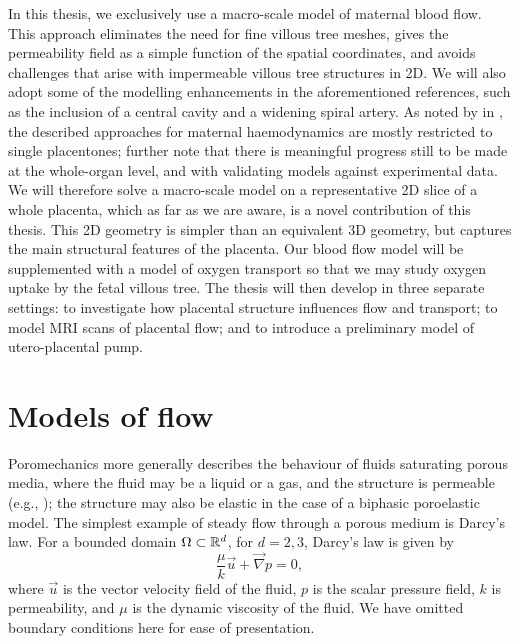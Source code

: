         In this thesis, we exclusively use a macro-scale model of maternal blood flow. This approach eliminates the need for fine villous tree meshes, gives the permeability field as a simple function of the spatial coordinates, and avoids challenges that arise with impermeable villous tree structures in 2D. We will also adopt some of the modelling enhancements in the aforementioned references, such as the inclusion of a central cavity and a widening spiral artery. As noted by \citeauthor{jensenBloodFlowTransport2019} in \cite{jensenBloodFlowTransport2019}, the described approaches for maternal haemodynamics are mostly restricted to single placentones; \citeauthor{jensenBloodFlowTransport2019} further note that there is meaningful progress still to be made at the whole-organ level, and with validating models against experimental data. We will therefore solve a macro-scale model on a representative 2D slice of a whole placenta, which as far as we are aware, is a novel contribution of this thesis. This 2D geometry is simpler than an equivalent 3D geometry, but captures the main structural features of the placenta. Our blood flow model will be supplemented with a model of oxygen transport so that we may study oxygen uptake by the fetal villous tree. The thesis will then develop in three separate settings: to investigate how placental structure influences flow and transport; to model MRI scans of placental flow; and to introduce a preliminary model of utero-placental pump.
        
    \section{Models of flow} 
        Poromechanics more generally describes the behaviour of fluids saturating porous media, where the fluid may be a liquid or a gas, and the structure is permeable (e.g., \cite{collisEffectiveEquationsGoverning2017}); the structure may also be elastic in the case of a biphasic poroelastic model. The simplest example of steady flow through a porous medium is Darcy's law. For a bounded domain $\Omega \subset \mathbb{R}^d$, for $d = 2, 3$, Darcy's law is given by
        \begin{equation}
            \frac{\mu}{k} \vec{u} + \vec{\nabla}p = 0,
            \label{eq:darcy-law}
        \end{equation}
        where $\vec{u}$ is the vector velocity field of the fluid, $p$ is the scalar pressure field, $k$ is permeability, and $\mu$ is the dynamic viscosity of the fluid. We have omitted boundary conditions here for ease of presentation.

